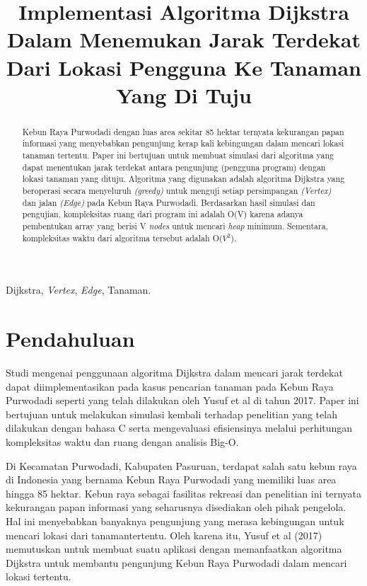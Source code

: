 \documentclass[conference]{IEEEtran}
\title{Implementasi Algoritma Dijkstra Dalam Menemukan Jarak Terdekat Dari Lokasi Pengguna Ke Tanaman Yang Di Tuju}
\author{\IEEEauthorblockN{Michelle Angelina}
\IEEEauthorblockA{\textit{School of Electrical Engineering and Informatics} \\
\textit{Institut Teknologi Bandung} \\
Bandung, Indonesia\\
Email: 18320007@std.stei.itb.ac.id}
}
\begin{document}
\maketitle
	\begin{abstract}
	Kebun Raya Purwodadi dengan luas area sekitar 85 hektar ternyata kekurangan papan informasi yang menyebabkan pengunjung kerap kali kebingungan dalam mencari lokasi tanaman tertentu. Paper ini bertujuan untuk membuat simulasi dari algoritma yang dapat menentukan jarak terdekat antara pengunjung (pengguna program) dengan lokasi tanaman yang dituju. Algoritma yang digunakan adalah algoritma Dijkstra yang beroperasi secara menyeluruh \textit{(greedy)} untuk menguji setiap persimpangan \textit{(Vertex)} dan jalan \textit{(Edge)} pada Kebun Raya Purwodadi. Berdasarkan hasil simulasi dan pengujian, kompleksitas ruang dari program ini adalah O(V) karena adanya pembentukan array yang berisi V \textit{nodes} untuk mencari \textit{heap} minimum. Sementara, kompleksitas waktu dari algoritma tersebut adalah O(\begin{math} V^2 \end{math}).
	\end{abstract}
	\begin{IEEEkeywords}
		Dijkstra, \textit{Vertex}, \textit{Edge}, Tanaman.
	\end{IEEEkeywords} 
	\section{Pendahuluan}
	Studi mengenai penggunaan algoritma Dijkstra dalam mencari jarak terdekat dapat diimplementasikan pada kasus pencarian tanaman pada Kebun Raya Purwodadi seperti yang telah dilakukan oleh Yusuf et al di tahun 2017\cite{implementasi}. Paper ini bertujuan untuk melakukan simulasi kembali terhadap penelitian yang telah dilakukan dengan bahasa C serta mengevaluasi efisiensinya melalui perhitungan kompleksitas waktu dan ruang dengan analisis Big-O.

	Di Kecamatan Purwodadi, Kabupaten Pasuruan, terdapat salah satu kebun raya di Indonesia yang bernama Kebun Raya Purwodadi yang memiliki luas area hingga 85 hektar. Kebun raya sebagai fasilitas rekreasi dan penelitian ini ternyata kekurangan papan informasi yang seharusnya disediakan oleh pihak pengelola. Hal ini menyebabkan banyaknya pengunjung yang merasa kebingungan untuk mencari lokasi dari tanamantertentu. Oleh karena itu, Yusuf et al (2017) memutuskan untuk membuat suatu aplikasi dengan memanfaatkan algoritma Dijkstra untuk membantu pengunjung Kebun Raya Purwodadi dalam mencari lokasi tertentu.
\end{document}
